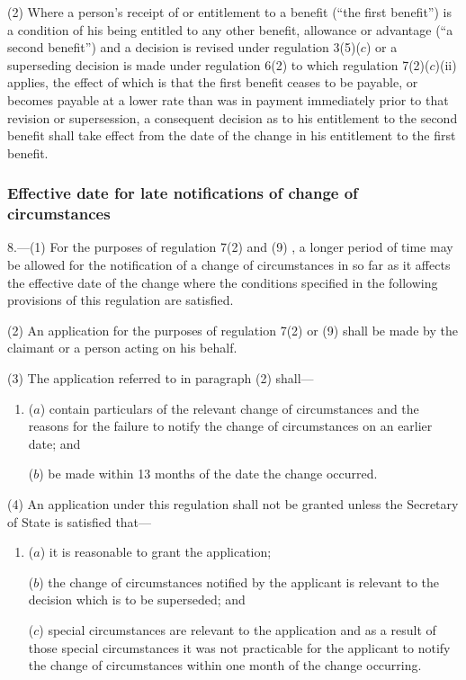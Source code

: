 \documentclass[12pt,a4paper]{article}
\begin{document}
(2) Where a person’s receipt of or entitlement to a benefit (“the first benefit”) is a condition of his being entitled to any other benefit, allowance or advantage (“a second benefit”) and a decision is revised under regulation 3(5)($c$) or a superseding decision is made under regulation 6(2) to which regulation 7(2)($c$)(ii) applies, the effect of which is that the first benefit ceases to be payable, or becomes payable at a lower rate than was in payment immediately prior to that revision or supersession, a consequent decision as to his entitlement to the second benefit shall take effect from the date of the change in his entitlement to the first benefit.


\subsubsection[8. Effective date for late notifications of change of circumstances]{Effective date for late notifications of change of circumstances}

8.—(1) For the purposes of regulation 7(2)
and (9)%
, a longer period of time may be allowed for the notification of a change of circumstances in so far as it affects the effective date of the change where the conditions specified in the following provisions of this regulation are satisfied.

(2) An application for the purposes of regulation 7(2) 
or (9)  %
shall be made by the claimant or a person acting on his behalf.

(3) The application referred to in paragraph (2) shall—
\begin{enumerate}\item[]
($a$) contain particulars of the relevant change of circumstances and the reasons for the failure to notify the change of circumstances on an earlier date; and

($b$) be made within 13 months of the date the change occurred.
\end{enumerate}

(4) An application under this regulation shall not be granted unless the Secretary of State is satisfied that—
\begin{enumerate}\item[]
($a$) it is reasonable to grant the application;

($b$) the change of circumstances notified by the applicant is relevant to the decision which is to be superseded; and

($c$) special circumstances are relevant to the application and as a result of those special circumstances it was not practicable for the applicant to notify the change of circumstances within one month of the change occurring.
\end{enumerate}
\end{document}
